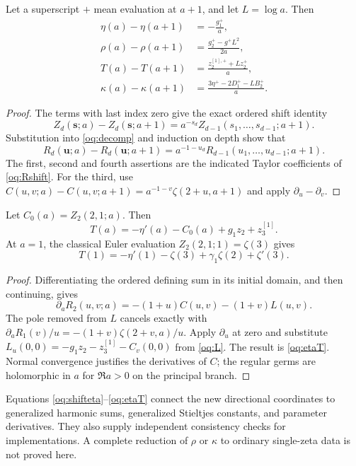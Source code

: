 \begin{proposition}\label{oq:shift}
Let a superscript $+$ mean evaluation at $a+1$, and let $L=\log a$.
Then
\begin{align}
 \eta(a)-\eta(a+1)&=-\frac{g_1^+}{a},\label{oq:shifteta}\\
 \rho(a)-\rho(a+1)&=\frac{g_2^+-g^+L^2}{2a},\label{oq:shiftrho}\\
 T(a)-T(a+1)&=\frac{z_2^{[1],+}+Lz_2^+}{a},\label{oq:shiftT}\\
 \kappa(a)-\kappa(a+1)&=
 \frac{3\eta^+-2D_1^+-LB_2^+}{a}.\label{oq:shiftkappa}
\end{align}
\end{proposition}
\begin{proof}
The terms with last index zero give the exact ordered shift identity
\[
 Z_d(\mathbf s;a)-Z_d(\mathbf s;a+1)
 =a^{-s_d}Z_{d-1}(s_1,\ldots,s_{d-1};a+1).
\]
Substitution into \eqref{oq:decomp} and induction on depth show that
\begin{equation}\label{oq:Rshift}
 R_d(\mathbf u;a)-R_d(\mathbf u;a+1)
 =a^{-1-u_d}R_{d-1}(u_1,\ldots,u_{d-1};a+1).
\end{equation}
The first, second and fourth assertions are the indicated Taylor
coefficients of \eqref{oq:Rshift}. For the third, use
$C(u,v;a)-C(u,v;a+1)=a^{-1-v}\zeta(2+u,a+1)$ and apply
$\partial_u-\partial_v$.
\end{proof}

\begin{proposition}\label{oq:derivative}
Let $C_0(a)=Z_2(2,1;a)$. Then
\begin{equation}\label{oq:etaT}
 T(a)=-\eta'(a)-C_0(a)+g_1z_2+z_3^{[1]}.
\end{equation}
At $a=1$, the classical Euler evaluation $Z_2(2,1;1)=\zeta(3)$ gives
\[
 T(1)=-\eta'(1)-\zeta(3)+\gamma_1\zeta(2)+\zeta'(3).
\]
\end{proposition}
\begin{proof}
Differentiating the ordered defining sum in its initial domain, and
then continuing, gives
\[
 \partial_aR_2(u,v;a)=-(1+u)C(u,v)-(1+v)L(u,v).
\]
The pole removed from $L$ cancels exactly with
$\partial_aR_1(v)/u=-(1+v)\zeta(2+v,a)/u$.
Apply $\partial_u$ at zero and substitute
$L_u(0,0)=-g_1z_2-z_3^{[1]}-C_v(0,0)$ from \eqref{oq:L}.
The result is \eqref{oq:etaT}. Normal convergence justifies the
derivatives of $C$; the regular germs are holomorphic in $a$ for
$\Re a>0$ on the principal branch.
\end{proof}

Equations \eqref{oq:shifteta}--\eqref{oq:etaT} connect the new directional
coordinates to generalized harmonic sums, generalized Stieltjes constants,
and parameter derivatives. They also supply independent consistency checks
for implementations. A complete reduction of $\rho$ or $\kappa$ to ordinary
single-zeta data is not proved here.
